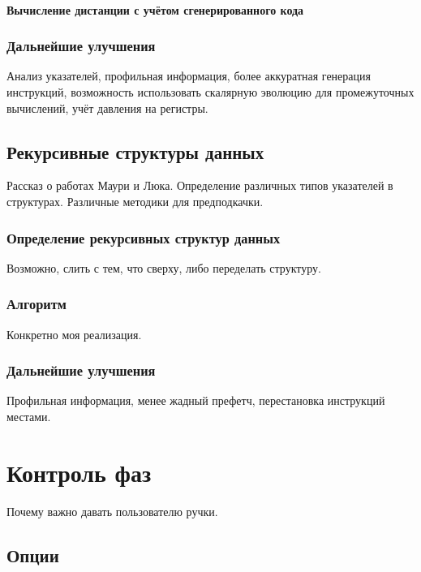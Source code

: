 \documentclass[12pt,a4paper]{article}
\begin{document}
\paragraph{Вычисление дистанции с учётом сгенерированного кода}

\subsubsection{Дальнейшие улучшения}

Анализ указателей, профильная информация, более аккуратная генерация инструкций, возможность использовать скалярную эволюцию для промежуточных вычислений, учёт давления на регистры.

\subsection{Рекурсивные структуры данных}

Рассказ о работах Маури и Люка. Определение различных типов указателей в структурах. Различные методики для предподкачки.

\subsubsection{Определение рекурсивных структур данных}

Возможно, слить с тем, что сверху, либо переделать структуру.

\subsubsection{Алгоритм}

Конкретно моя реализация.

\subsubsection{Дальнейшие улучшения}

Профильная информация, менее жадный префетч, перестановка инструкций местами.

\section{Контроль фаз}

Почему важно давать пользователю ручки.

\subsection{Опции}
\end{document}
